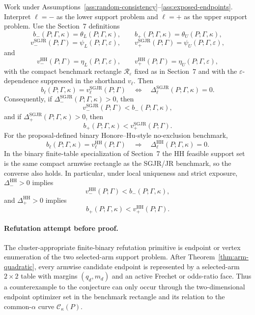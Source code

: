 \begin{theorem}\label{thm:coupling-iff-confirmed}
Work under Assumptions~\ref{ass:random-consistency}--\ref{ass:exposed-endpoints}.  Interpret \(\ell=-\) as the lower support problem and \(\ell=+\) as the upper support problem.  Use the Section~7 definitions
\[
  b_-(P;\Gamma,\kappa)=\theta_L(P;\Gamma,\kappa),\qquad
  b_+(P;\Gamma,\kappa)=\theta_U(P;\Gamma,\kappa),
\]
\[
  v_-^{\mathrm{SGJR}}(P;\Gamma)=\psi_L(P;\Gamma,\varepsilon),\qquad
  v_+^{\mathrm{SGJR}}(P;\Gamma)=\psi_U(P;\Gamma,\varepsilon),
\]
and
\[
  v_-^{\mathrm{HH}}(P;\Gamma)=\eta_L(P;\Gamma,\varepsilon),\qquad
  v_+^{\mathrm{HH}}(P;\Gamma)=\eta_U(P;\Gamma,\varepsilon),
\]
with the compact benchmark rectangle \(\mathcal R_\varepsilon\) fixed as in Section~7 and with the \(\varepsilon\)-dependence suppressed in the shorthand \(v_\ell\).  Then
\[
  b_\ell(P;\Gamma,\kappa)=v_\ell^{\mathrm{SGJR}}(P;\Gamma)
  \quad\Longleftrightarrow\quad
  \Delta_\ell^{\mathrm{SGJR}}(P;\Gamma,\kappa)=0.
\]
Consequently, if \(\Delta_-^{\mathrm{SGJR}}(P;\Gamma,\kappa)>0\), then
\[
  v_-^{\mathrm{SGJR}}(P;\Gamma)<b_-(P;\Gamma,\kappa),
\]
and if \(\Delta_+^{\mathrm{SGJR}}(P;\Gamma,\kappa)>0\), then
\[
  b_+(P;\Gamma,\kappa)<v_+^{\mathrm{SGJR}}(P;\Gamma).
\]
For the proposal-defined binary Honore--Hu-style no-exclusion benchmark,
\[
  b_\ell(P;\Gamma,\kappa)=v_\ell^{\mathrm{HH}}(P;\Gamma)
  \quad\Longrightarrow\quad
  \Delta_\ell^{\mathrm{HH}}(P;\Gamma,\kappa)=0.
\]
In the binary finite-table specialization of Section~7 the HH feasible support set is the same compact armwise rectangle as the SGJR/JR benchmark, so the converse also holds.  In particular, under local uniqueness and strict exposure, \(\Delta_-^{\mathrm{HH}}>0\) implies
\[
  v_-^{\mathrm{HH}}(P;\Gamma)<b_-(P;\Gamma,\kappa),
\]
and \(\Delta_+^{\mathrm{HH}}>0\) implies
\[
  b_+(P;\Gamma,\kappa)<v_+^{\mathrm{HH}}(P;\Gamma).
\]
\end{theorem}

\paragraph{Refutation attempt before proof.}
The cluster-appropriate finite-binary refutation primitive is endpoint or vertex enumeration of the two selected-arm support problem.  After Theorem~\ref{thm:arm-quadratic}, every armwise candidate endpoint is represented by a selected-arm \(2\times2\) table with margins \((q_d,m_d)\) and an active Frechet or odds-ratio face.  Thus a counterexample to the conjecture can only occur through the two-dimensional endpoint optimizer set in the benchmark rectangle and its relation to the common-\(\alpha\) curve \(\mathcal C_\kappa(P)\).

